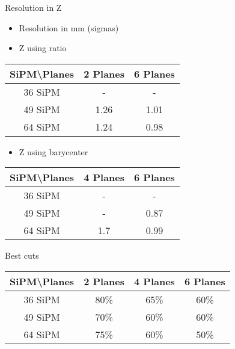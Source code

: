 \documentclass{beamer}
\begin{document}
\begin{frame}{Resolution in Z}
\begin{center}
\begin{itemize}
\item Resolution in mm (sigmas)
\item Z using ratio
\vspace{0.5 cm}
\end{itemize}
 \begin{tabular}{c|cc|}
  \toprule
  SiPM\textbackslash Planes & \textbf{2 Planes} & \textbf{6 Planes} \\
   \hline
  36 SiPM & - & -  \\
  49 SiPM & 1.26 & 1.01 \\
  64 SiPM & 1.24 & 0.98 \\
    \toprule
 \end{tabular}
 
 \begin{itemize}
 \item Z using barycenter
 \vspace{0.5 cm}
 \end{itemize}
 
  \begin{tabular}{c|cc|}
   \toprule
   SiPM\textbackslash Planes & \textbf{4 Planes} & \textbf{6 Planes} \\
    \hline
   36 SiPM & - & -  \\
   49 SiPM & - & 0.87 \\
   64 SiPM & 1.7 & 0.99 \\
     \toprule
  \end{tabular}
\end{center}
\end{frame}


\begin{frame}{Best cuts}
\begin{center}
 \begin{tabular}{c|ccc|}
  \toprule
  SiPM\textbackslash Planes & \textbf{2 Planes} & \textbf{4 Planes} & \textbf{6 Planes} \\
   \hline
  36 SiPM & 80\% & 65\% & 60\% \\
  49 SiPM & 70\% & 60\% & 60\% \\
  64 SiPM & 75\% & 60\% & 50\% \\
    \toprule
 \end{tabular}
\end{center}
\end{frame}
\end{document}
